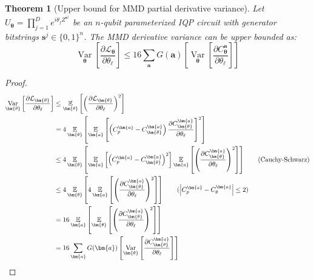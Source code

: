 \documentclass[a4paper,onecolumn,notitlepage,nofootinbib,longbibliography,superscriptaddress, floatfix, pra, aps, 10pt]{revtex4-2}
\newcommand{\vttheta}{{\bm{\theta}}}
\newcommand{\vta}{{\bm{a}}}
\newcommand{\vtsj}{{\bm{s}^j}}
\newtheorem{theorem}{Theorem}
\begin{document}
\begin{theorem}[Upper bound for MMD partial derivative variance]
Let $U_\vttheta = \prod_{j=1}^D e^{i \theta_j Z^\vtsj}$ be an $n$-qubit parameterized IQP circuit with generator
bitstrings $\vtsj \in \{0,1\}^n$. The MMD derivative variance can be upper bounded as:
\begin{equation}
    \operatorname*{Var}_{\vttheta} \left[ \frac{\partial \mathcal{L}_\vttheta}{\partial \theta_\ell} \right] \leq 16 \sum_\vta G(\vta)\left[  \operatorname*{Var}_{\vttheta} \left[ \frac{\partial C^\vta_\vttheta}{\partial \theta_\ell} \right]\right]
\end{equation}
\end{theorem}
\begin{proof}
\begin{align}
\operatorname*{Var}_{\vttheta} \left[ \frac{\partial \mathcal{L}_\vttheta}{\partial \theta_\ell} \right] &\leq \operatorname*{\mathbb{E}}_{\vttheta} \left[ \left(\frac{\partial \mathcal{L}_\vttheta}{\partial \theta_\ell} \right)^2 \right] \\
&= 4\operatorname*{\mathbb{E}}_{\vttheta} \left[  \operatorname*{\mathbb{E}}_{\vta}\left[\left( C^\vta_p - C^\vta_\vttheta \right) \frac{\partial C^\vta_\vttheta}{\partial \theta_\ell} \right]^2  \right] \\
&\leq 4\operatorname*{\mathbb{E}}_{\vttheta} \left[  \operatorname*{\mathbb{E}}_{\vta}\left[\left( C^\vta_p - C^\vta_\vttheta \right)^2 \right] \operatorname*{\mathbb{E}}_{\vta}\left[\left(\frac{\partial C^\vta_\vttheta}{\partial \theta_\ell} \right)^2\right]\right] \qquad \text{(Cauchy-Schwarz)}\\
&\leq 4\operatorname*{\mathbb{E}}_{\vttheta} \left[  4 \operatorname*{\mathbb{E}}_{\vta}\left[\left(\frac{\partial C^\vta_\vttheta}{\partial \theta_\ell} \right)^2\right]\right] \qquad (\abs{C^\vta_p - C^\vta_\theta} \leq 2)\\
&= 16 \operatorname*{\mathbb{E}}_{\vta} \left[\operatorname*{\mathbb{E}}_{\vttheta}\left[\left(\frac{\partial C^\vta_\vttheta}{\partial \theta_\ell} \right)^2\right]\right] \\
&= 16 \sum_\vta G(\vta)\left[  \operatorname*{Var}_{\vttheta} \left[ \frac{\partial C^\vta_\vttheta}{\partial \theta_\ell} \right]\right]
\end{align}
\end{proof}
\end{document}
